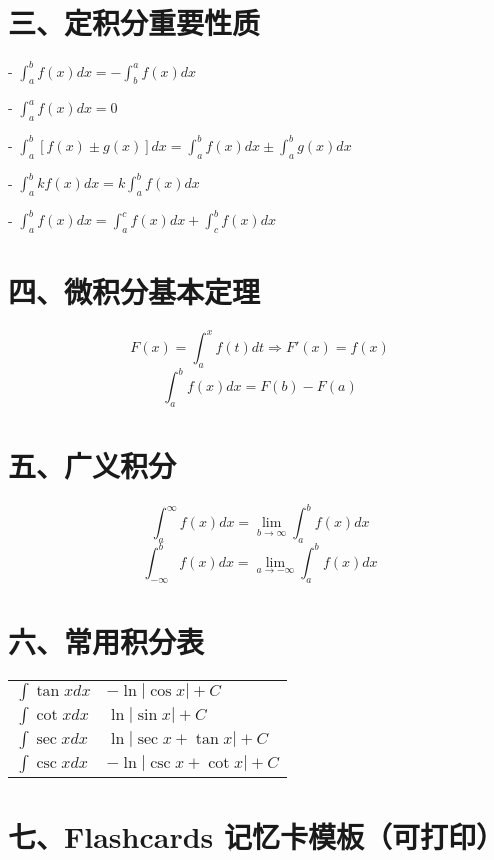 \documentclass[UTF8]{ctexart}
\newcommand{\simsun}{\CJKfamily{gbsn}\zihao{-5}} %
\begin{document}
	
	\section*{三、定积分重要性质}
	
	
	- $\displaystyle \int_a^b f(x)dx = -\int_b^a f(x)dx$
	
	- $\displaystyle \int_a^a f(x)dx = 0$
	
	- $\displaystyle \int_a^b [f(x) \pm g(x)]dx = \int_a^b f(x)dx \pm \int_a^b g(x)dx$
	
	- $\displaystyle \int_a^b k f(x)dx = k \int_a^b f(x)dx$
	
	- $\displaystyle \int_a^b f(x)dx = \int_a^c f(x)dx + \int_c^b f(x)dx$
	
	
	\section*{四、微积分基本定理}
	$$
	F(x) = \int_a^x f(t)dt \Rightarrow F'(x) = f(x)
	$$
	$$
	\int_a^b f(x)dx = F(b) - F(a)
	$$
	
	\section*{五、广义积分}
	$$
	\int_a^\infty f(x)dx = \lim_{b \to \infty} \int_a^b f(x)dx
	$$
	$$
	\int_{-\infty}^b f(x)dx = \lim_{a \to -\infty} \int_a^b f(x)dx
	$$
	
	\section*{六、常用积分表}
	\begin{tabular}{|l|l|}
		\hline
		$\int \tan x dx$ & $-\ln|\cos x| + C$ \\
		$\int \cot x dx$ & $\ln|\sin x| + C$ \\
		$\int \sec x dx$ & $\ln|\sec x + \tan x| + C$ \\
		$\int \csc x dx$ & $-\ln|\csc x + \cot x| + C$ \\
		\hline
	\end{tabular}
	
	\section*{七、Flashcards 记忆卡模板（可打印）}
	
\end{document}
